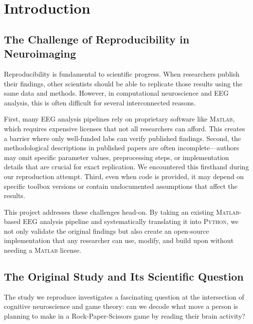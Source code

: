 \documentclass[11pt,a4paper]{article}
\newcommand{\matlab}{\textsc{Matlab}}
\newcommand{\python}{\textsc{Python}}
\begin{document}
\newpage
\tableofcontents
\newpage


\section{Introduction}
\label{sec:introduction}

\subsection{The Challenge of Reproducibility in Neuroimaging}
\label{subsec:reproducibility}

Reproducibility is fundamental to scientific progress. When researchers publish their findings, other scientists should be able to replicate those results using the same data and methods. However, in computational neuroscience and EEG analysis, this is often difficult for several interconnected reasons.

First, many EEG analysis pipelines rely on proprietary software like \matlab{}, which requires expensive licenses that not all researchers can afford. This creates a barrier where only well-funded labs can verify published findings. Second, the methodological descriptions in published papers are often incomplete---authors may omit specific parameter values, preprocessing steps, or implementation details that are crucial for exact replication. We encountered this firsthand during our reproduction attempt. Third, even when code is provided, it may depend on specific toolbox versions or contain undocumented assumptions that affect the results.

This project addresses these challenges head-on. By taking an existing \matlab{}-based EEG analysis pipeline and systematically translating it into \python{}, we not only validate the original findings but also create an open-source implementation that any researcher can use, modify, and build upon without needing a \matlab{} license.

\subsection{The Original Study and Its Scientific Question}
\label{subsec:original_study}

The study we reproduce investigates a fascinating question at the intersection of cognitive neuroscience and game theory: can we decode what move a person is planning to make in a Rock-Paper-Scissors game by reading their brain activity?
\end{document}
